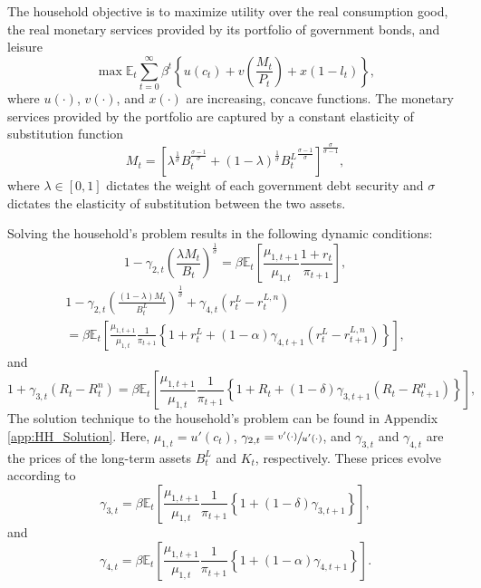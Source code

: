 \documentclass[11pt,a4paper,margin=1.5in]{article}
\begin{document}
The household objective is to maximize utility over the real consumption good, the real monetary services provided by its portfolio of government bonds, and leisure
\begin{equation}
	\max\mathbb{E}_t\! \sum^\infty_{t=0} \beta^t\left\{u(c_t) + v\left(\frac{M_t}{P_t}\right) + x(1-l_t)\right\},
	\label{eq:HH_Utility}
\end{equation}
where $u(\cdot)$, $v(\cdot)$, and $x(\cdot)$ are increasing, concave functions. 
The monetary services provided by the portfolio are captured by a constant elasticity of substitution function 
\begin{equation}
	M_t = \left[\lambda^{\frac{1}{\sigma}}B_t^{\frac{\sigma-1}{\sigma}} + (1-\lambda)^{\frac{1}{\sigma}}{B^L_t}^{\frac{\sigma-1}{\sigma}}\right]^{\frac{\sigma}{\sigma-1}},
	\label{eq:HH_MonServices}
\end{equation}
where $\lambda \in [0,1]$ dictates the weight of each government debt security and $\sigma$ dictates the elasticity of substitution between the two assets.

Solving the household's problem results in the following dynamic conditions:
\begin{equation}
	1 - \gamma_{2,t}\left(\frac{\lambda M_t}{B_t}\right)^\frac{1}{\sigma} = \beta \mathbb{E}_t\!\left[\frac{\mu_{1,t+1}}{\mu_{1,t}}\frac{1+r_t}{\pi_{t+1}}\right],
	\label{eq:HH_manOC_B}
\end{equation}
%
\begin{multline}
	1 - \gamma_{2,t}\left(\frac{(1-\lambda)M_t}{B^L_t}\right)^\frac{1}{\sigma} + \gamma_{4,t}\left(r^L_t-r^{L,n}_t\right) \\
	= \beta \mathbb{E}_t\!\left[\frac{\mu_{1,t+1}}{\mu_{1,t}}\frac{1}{\pi_{t+1}} \left\{ 1+r^L_t + (1-\alpha)\gamma_{4,t+1} \left(r^L_t-r^{L,n}_{t+1}\right)\right\}\right],
	\label{eq:HH_manOC_BL}
\end{multline}
%
and
\begin{equation}
	1 + \gamma_{3,t}\left(R_t - R^{n}_t\right)  = \beta\mathbb{E}_t\!\left[\frac{\mu_{1,t+1}}{\mu_{1,t}}\frac{1}{\pi_{t+1}}\left\{ 1 + R_{t} + (1-\delta)\gamma_{3,{t+1}}\left(R_{t} - R^{n}_{t+1}\right)\right\}\right],
	\label{eq:HH_manOC_K}
\end{equation}
The solution technique to the household's problem can be found in Appendix \ref{app:HH_Solution}.
Here, $\mu_{1,t} = u'(c_t)$, $\gamma_{2,t} = \sfrac{v'(\cdot)}{u'(\cdot)}$, and $\gamma_{3,t}$ and $\gamma_{4,t}$ are the prices of the long-term assets $B^L_t$ and $K_t$, respectively.
These prices evolve according to
\begin{equation}
	\gamma_{3,t} = \beta\mathbb{E}_t\!\left[\frac{\mu_{1,t+1}}{\mu_{1,t}}\frac{1}{\pi_{t+1}} \left\{1 + (1-\delta)\gamma_{3,{t+1}}\right\}\right],
	\label{eq:HH_manOC_R}
\end{equation}
%
and
\begin{equation}
	\gamma_{4,t} = \beta\mathbb{E}_t\!\left[\frac{\mu_{1,t+1}}{\mu_{1,t}}\frac{1}{\pi_{t+1}} \left\{1 + (1-\alpha)\gamma_{4,{t+1}}\right\}\right].
	\label{eq:HH_manOC_rL}
\end{equation}
\end{document}
